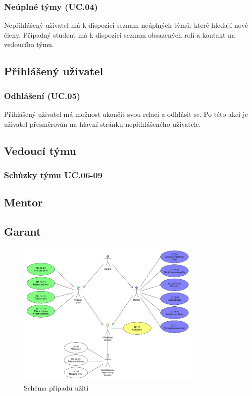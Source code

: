 \documentclass[czech,BP]{thesiskiv}
\begin{document}
			\subsubsection{Neúplné týmy (UC.04)}
				\par Nepřihlášený uživatel má k dispozici seznam neúplných týmů, které hledají nové členy. Případný student má k dispozici seznam obsazených rolí a kontakt na vedoucího týmu.
		\subsection{Přihlášený uživatel}
			\subsubsection{Odhlášení (UC.05)}
				\par Přihlášený uživatel má možnost ukončit svou relaci a odhlásit se. Po této akci je uživatel přesměrován na hlavní stránku nepřihlášeného uživatele.
		\subsection{Vedoucí týmu}
			\subsubsection{Schůzky týmu UC.06-09}
				\par 
		\subsection{Mentor}
		\subsection{Garant}
		\begin{figure}[h]
			\centering
			\includegraphics[width=0.8\textwidth]{img/use_case/use_case_diagram}
			\caption{Schéma případů užití}
		\end{figure}
\end{document}
